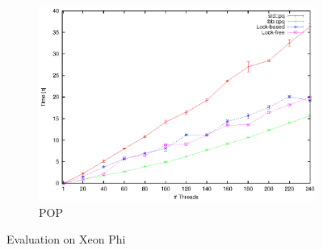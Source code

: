 \begin{figure}[t]
\begin{subfigure}[b]{0.3\textwidth}
		\centering
		\includegraphics[width=\textwidth]{../plots/xp_pop/runtime_pop}
		\caption{POP}
		\label{fig:xp_pop}
	\end{subfigure}
	\caption{Evaluation on Xeon Phi}
	\label{fig:eval_xp}
\end{figure}


